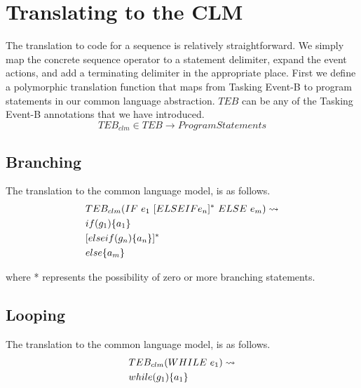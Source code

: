 \section{Translating to the CLM}\label{TEBCLM}
The translation to code for a sequence is relatively straightforward. We simply map the concrete sequence operator to a statement delimiter, expand the event actions, and add a terminating delimiter in the appropriate place. First we define a polymorphic translation function that maps from Tasking Event-B to program statements in our common language abstraction.  $TEB$ can be any of the Tasking Event-B annotations that we have introduced.
\begin{equation}\label{clmType}
TEB_{clm} \in  TEB \rightarrow ProgramStatements
\end{equation}

\subsection{Branching}
The translation to the common language model, is as follows.
\begin{equation}
\begin{split}
&TEB_{clm}(IF~ e_1~[ELSEIF e_n]^*~ELSE~ e_m) \leadsto\\
& if(g_1)\{ a_1 \} \\
&[elseif(g_n)\{a_n\}]^*\\
& else\{a_m \}
\end{split}
\notag
\end{equation}

where * represents the possibility of zero or more branching statements.

\subsection{Looping}
The translation to the common language model, is as follows.
\begin{equation}
\begin{split}
&TEB_{clm}(WHILE~ e_1 ) \leadsto\\
& while(g_1)\{ a_1 \}
\end{split}
\notag
\end{equation}

